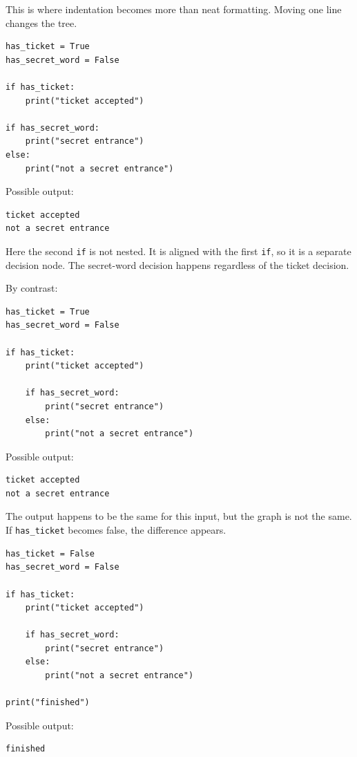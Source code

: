 This is where indentation becomes more than neat formatting. Moving one line changes the tree.

\begin{verbatim}
has_ticket = True
has_secret_word = False

if has_ticket:
    print("ticket accepted")

if has_secret_word:
    print("secret entrance")
else:
    print("not a secret entrance")
\end{verbatim}

Possible output:

\begin{verbatim}
ticket accepted
not a secret entrance
\end{verbatim}

Here the second \texttt{if} is not nested. It is aligned with the first \texttt{if}, so it is a separate decision node. The secret-word decision happens regardless of the ticket decision.

By contrast:

\begin{verbatim}
has_ticket = True
has_secret_word = False

if has_ticket:
    print("ticket accepted")

    if has_secret_word:
        print("secret entrance")
    else:
        print("not a secret entrance")
\end{verbatim}

Possible output:

\begin{verbatim}
ticket accepted
not a secret entrance
\end{verbatim}

The output happens to be the same for this input, but the graph is not the same. If \texttt{has\_ticket} becomes false, the difference appears.

\begin{verbatim}
has_ticket = False
has_secret_word = False

if has_ticket:
    print("ticket accepted")

    if has_secret_word:
        print("secret entrance")
    else:
        print("not a secret entrance")

print("finished")
\end{verbatim}

Possible output:

\begin{verbatim}
finished
\end{verbatim}


